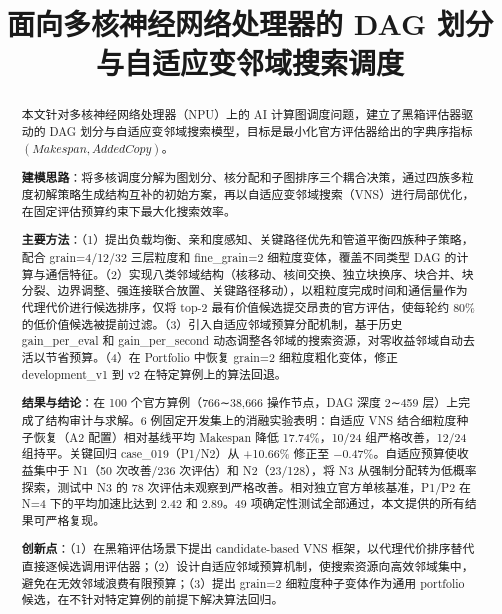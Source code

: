 \documentclass[bwprint]{gmcmthesis}
\title{面向多核神经网络处理器的 DAG 划分与自适应变邻域搜索调度}
\begin{document}
\maketitle

\begin{abstract}
本文针对多核神经网络处理器（NPU）上的 AI 计算图调度问题，建立了黑箱评估器驱动的 DAG 划分与自适应变邻域搜索模型，目标是最小化官方评估器给出的字典序指标 $(Makespan, AddedCopy)$。

\textbf{建模思路}：将多核调度分解为图划分、核分配和子图排序三个耦合决策，通过四族多粒度初解策略生成结构互补的初始方案，再以自适应变邻域搜索（VNS）进行局部优化，在固定评估预算约束下最大化搜索效率。

\textbf{主要方法}：（1）提出负载均衡、亲和度感知、关键路径优先和管道平衡四族种子策略，配合 grain=4/12/32 三层粒度和 fine\_grain=2 细粒度变体，覆盖不同类型 DAG 的计算与通信特征。（2）实现八类邻域结构（核移动、核间交换、独立块换序、块合并、块分裂、边界调整、强连接联合放置、关键路径移动），以粗粒度完成时间和通信量作为代理代价进行候选排序，仅将 top-2 最有价值候选提交昂贵的官方评估，使每轮约 80\% 的低价值候选被提前过滤。（3）引入自适应邻域预算分配机制，基于历史 gain\_per\_eval 和 gain\_per\_second 动态调整各邻域的搜索资源，对零收益邻域自动去活以节省预算。（4）在 Portfolio 中恢复 grain=2 细粒度粗化变体，修正 development\_v1 到 v2 在特定算例上的算法回退。

\textbf{结果与结论}：在 100 个官方算例（766∼38,666 操作节点，DAG 深度 2∼459 层）上完成了结构审计与求解。6 例固定开发集上的消融实验表明：自适应 VNS 结合细粒度种子恢复（A2 配置）相对基线平均 Makespan 降低 17.74\%，10/24 组严格改善，12/24 组持平。关键回归 case\_019（P1/N2）从 +10.66\% 修正至 −0.47\%。自适应预算使收益集中于 N1（50 次改善/236 次评估）和 N2（23/128），将 N3 从强制分配转为低概率探索，测试中 N3 的 78 次评估未观察到严格改善。相对独立官方单核基准，P1/P2 在 N=4 下的平均加速比达到 2.42 和 2.89。49 项确定性测试全部通过，本文提供的所有结果可严格复现。

\textbf{创新点}：（1）在黑箱评估场景下提出 candidate-based VNS 框架，以代理代价排序替代直接逐候选调用评估器；（2）设计自适应邻域预算机制，使搜索资源向高效邻域集中，避免在无效邻域浪费有限预算；（3）提出 grain=2 细粒度种子变体作为通用 portfolio 候选，在不针对特定算例的前提下解决算法回归。

\end{abstract}
\end{document}
